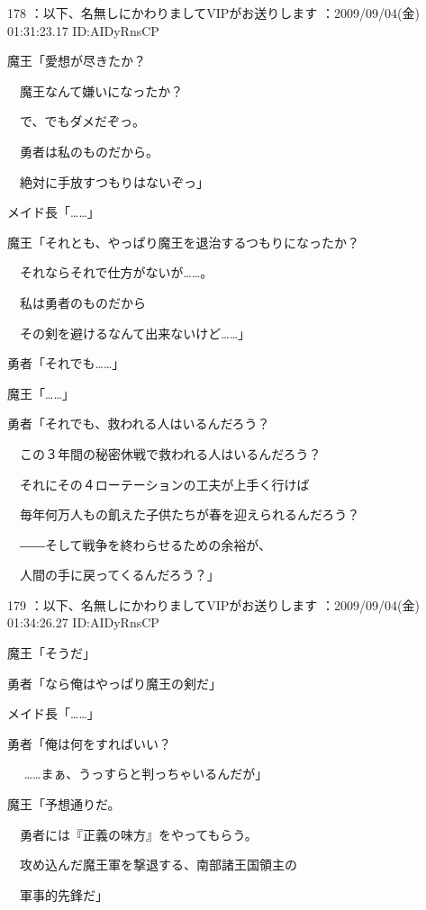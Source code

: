 \documentclass[a4j,twocolumn]{tarticle}
\begin{document}
	

	

178 ：以下、名無しにかわりましてVIPがお送りします ：2009/09/04(金) 01:31:23.17 ID:AIDyRnsCP 


魔王「愛想が尽きたか？ \par{}
　魔王なんて嫌いになったか？\par{} 
　で、でもダメだぞっ。\par{} 
　勇者は私のものだから。\par{} 
　絶対に手放すつもりはないぞっ」 



メイド長「……」 



魔王「それとも、やっぱり魔王を退治するつもりになったか？\par{} 
　それならそれで仕方がないが……。 \par{}
　私は勇者のものだから\par{} 
　その剣を避けるなんて出来ないけど……」 



勇者「それでも……」\par{} 
魔王「……」 



勇者「それでも、救われる人はいるんだろう？\par{} 
　この３年間の秘密休戦で救われる人はいるんだろう？ \par{}
　それにその４ローテーションの工夫が上手く行けば\par{} 
　毎年何万人もの飢えた子供たちが春を迎えられるんだろう？ \par{}
　――そして戦争を終わらせるための余裕が、\par{} 
　人間の手に戻ってくるんだろう？」 

	
    
    

179 ：以下、名無しにかわりましてVIPがお送りします ：2009/09/04(金) 01:34:26.27 ID:AIDyRnsCP 


魔王「そうだ」\par{}
勇者「なら俺はやっぱり魔王の剣だ」 



メイド長「……」 



勇者「俺は何をすればいい？\par{}　 
……まぁ、うっすらと判っちゃいるんだが」 



魔王「予想通りだ。\par{} 
　勇者には『正義の味方』をやってもらう。 \par{}
　攻め込んだ魔王軍を撃退する、南部諸王国領主の\par{} 
　軍事的先鋒だ」 
\end{document}
